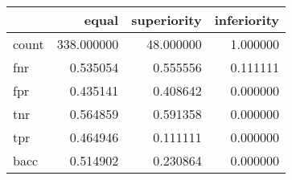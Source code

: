 \begin{tabular}{lrrr}
\toprule
{} &       equal &  superiority &  inferiority \\
\midrule
count &  338.000000 &    48.000000 &     1.000000 \\
fnr   &    0.535054 &     0.555556 &     0.111111 \\
fpr   &    0.435141 &     0.408642 &     0.000000 \\
tnr   &    0.564859 &     0.591358 &     0.000000 \\
tpr   &    0.464946 &     0.111111 &     0.000000 \\
bacc  &    0.514902 &     0.230864 &     0.000000 \\
\bottomrule
\end{tabular}
